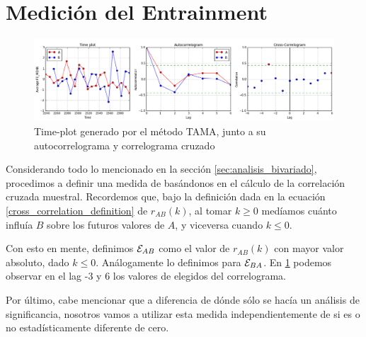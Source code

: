 \section{Medición del Entrainment}
\label{sec:method_entrainment}

\begin{figure}
\centering
\includegraphics[width=15cm]{images/time_plot_with_cross_correlation.png}
\caption{Time-plot generado por el método TAMA, junto a su autocorrelograma y correlograma cruzado}
\label{fig:time_plot_with_bivariate}
\end{figure}

Considerando todo lo mencionado en la sección \ref{sec:analisis_bivariado}, procedimos a definir una medida de \entrainment basándonos en el cálculo de la correlación cruzada muestral. Recordemos que, bajo la definición dada en la ecuación \ref{cross_correlation_definition} de $r_{AB}(k)$, al tomar $k \geq 0$ medíamos cuánto influía $B$ sobre los futuros valores de $A$, y viceversa cuando $k \leq 0$.

Con esto en mente, definimos $\mathcal{E}_{AB}$ como el valor de $r_{AB}(k)$ con mayor valor absoluto, dado $k \leq 0$. Análogamente lo definimos para $\mathcal{E}_{BA}$. En \ref{fig:time_plot_with_bivariate} podemos observar en el lag -3 y 6 los valores de \entrainment elegidos del correlograma.

Por último, cabe mencionar que a diferencia de \cite{KOU2008.2} dónde sólo se hacía un análisis de significancia, nosotros vamos a utilizar esta medida independientemente de si es o no estadísticamente diferente de cero.
